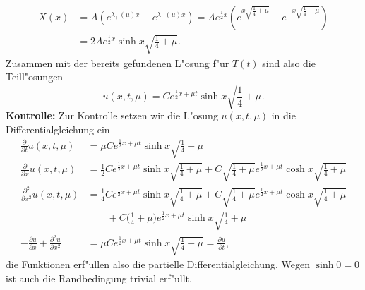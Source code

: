 {\begin{loesung}
\begin{teilaufgaben}
\begin{align*}
X(x)&=A(e^{\lambda_+(\mu)x}-e^{\lambda_-(\mu)x})
=Ae^{\frac12x}\left(
e^{x\sqrt{\frac14+\mu}}
-
e^{-x\sqrt{\frac14+\mu}}
\right)
\\
&=2Ae^{\frac12x}\sinh x\sqrt{\frac14+\mu}.
\end{align*}
Zusammen mit der bereits gefundenen L"osung f"ur $T(t)$ sind also
die Teill"osungen
\[
u(x,t,\mu)=
Ce^{\frac12x+\mu t}\sinh x\sqrt{\frac14+\mu}.
\]
{\bf Kontrolle:} Zur Kontrolle setzen wir die L"osung $u(x,t,\mu)$
in die Differentialgleichung ein
\begin{align*}
\frac{\partial}{\partial t}u(x,t,\mu)&=
\mu Ce^{\frac12x+\mu t}\sinh x\sqrt{\frac14+\mu}
\\
\frac{\partial}{\partial x}u(x,t,\mu)&=
\frac12
Ce^{\frac12x+\mu t}\sinh x\sqrt{\frac14+\mu}
+
C\sqrt{\frac14+\mu}e^{\frac12x+\mu t}\cosh x\sqrt{\frac14+\mu}
\\
\frac{\partial^2}{\partial x^2}u(x,t,\mu)&=
\frac14
Ce^{\frac12x+\mu t}\sinh x\sqrt{\frac14+\mu}
+
C\sqrt{\frac14+\mu}e^{\frac12x+\mu t}\cosh x\sqrt{\frac14+\mu}
\\
&\qquad +
C\biggl(\frac14+\mu\biggr)e^{\frac12x+\mu t}\sinh x\sqrt{\frac14+\mu}
\\
-\frac{\partial u}{\partial x}
+
\frac{\partial^2 u}{\partial x^2}
&=
\mu Ce^{\frac12x+\mu t}\sinh x\sqrt{\frac14+\mu}
=
\frac{\partial u}{\partial t},
\end{align*}
die Funktionen erf"ullen also die partielle Differentialgleichung.
Wegen $\sinh 0=0$ ist auch die Randbedingung trivial erf"ullt.
\end{teilaufgaben}
\end{loesung}
}{ }

